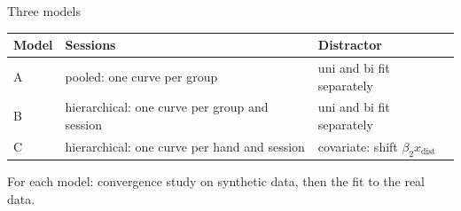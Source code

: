 \begin{frame}{Three models}
  \centering
  \begin{tabular}{lll}
    \toprule
    Model & Sessions & Distractor \\
    \midrule
    A & pooled: one curve per group & uni and bi fit separately \\
    B & hierarchical: one curve per group and session & uni and bi fit separately \\
    C & hierarchical: one curve per hand and session & covariate: shift $\beta_2 x_\text{dist}$ \\
    \bottomrule
  \end{tabular}
  \vfill
  \raggedright
  For each model: convergence study on synthetic data, then the fit to the real data.
\end{frame}
